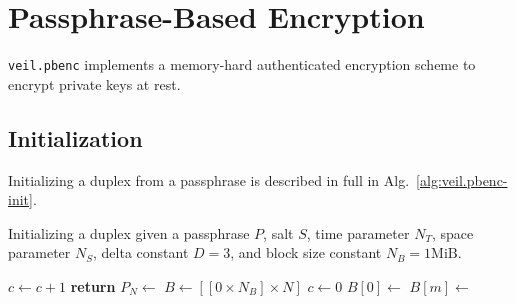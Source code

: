 \section{Passphrase-Based Encryption}\label{sec:veil.pbenc}

\texttt{veil.pbenc} implements a memory-hard authenticated encryption scheme to encrypt private keys at rest.

\subsection{Initialization}\label{subsec:veil.pbenc-init}

Initializing a duplex from a passphrase is described in full in Alg.~\ref{alg:veil.pbenc-init}\@.

\begin{algorithm}[ht]
    \caption{
        Initializing a duplex given a passphrase $P$, salt $S$, time parameter $N_T$, space parameter $N_S$, delta
        constant $D = 3$, and block size constant $N_B = 1 \text{MiB}$.
    }
    \begin{algorithmic}
            \State $c \gets c + 1$
            \State {}
            \State {}
            \State {}
            \State \textbf{return} 
        \EndFunction
            \State {}
            \State $P_N \gets$
            \State {}
            \State {}
            \State {}
            \State {}
            \State {}
            \State {}
            \State
            \State $B \gets [[0 \times N_B] \times N]$
            \State $c \gets 0$
            \State
            \State $B[0] \gets $
                \State $B[m] \gets $
            \EndFor
            \State


\end{algorithmic}
\end{algorithm}
